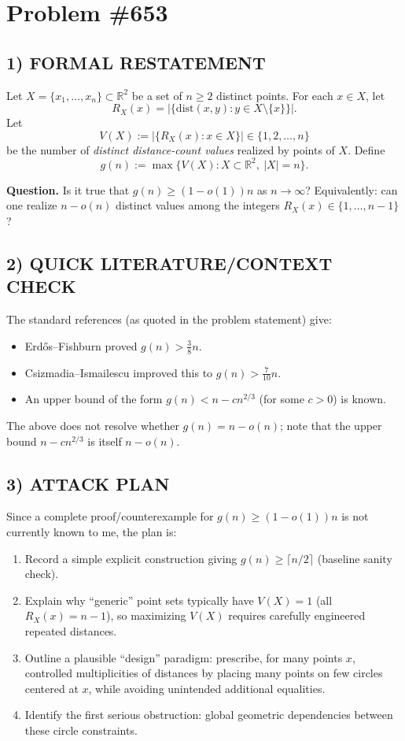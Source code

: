 \section*{Problem \#653}

\subsection*{1) FORMAL RESTATEMENT}

Let $X=\{x_1,\dots,x_n\}\subset\mathbb{R}^2$ be a set of $n\ge 2$ distinct points.
For each $x\in X$, let
\[
R_X(x)=\left\lvert \{\mathrm{dist}(x,y):y\in X\setminus\{x\}\} \right\rvert.
\]
Let
\[
V(X):=\left\lvert \{R_X(x):x\in X\} \right\rvert\in\{1,2,\dots,n\}
\]
be the number of \emph{distinct distance-count values} realized by points of $X$.
Define
\[
 g(n):=\max\{V(X):X\subset\mathbb{R}^2,\ \left\lvert X \right\rvert=n\}.
\]

\medskip
\noindent
\textbf{Question.} Is it true that $g(n)\ge (1-o(1))n$ as $n\to\infty$?
Equivalently: can one realize $n-o(n)$ distinct values among the integers $R_X(x)\in\{1,\dots,n-1\}$?

\subsection*{2) QUICK LITERATURE/CONTEXT CHECK}

The standard references (as quoted in the problem statement) give:
\begin{itemize}[leftmargin=2.2em]
\item Erd\H{o}s--Fishburn proved $g(n)>\tfrac{3}{8}n$.
\item Csizmadia--Ismailescu improved this to $g(n)>\tfrac{7}{10}n$.
\item An upper bound of the form $g(n)<n-cn^{2/3}$ (for some $c>0$) is known.
\end{itemize}
The above does not resolve whether $g(n)=n-o(n)$; note that the upper bound $n-cn^{2/3}$ is itself $n-o(n)$.

\subsection*{3) ATTACK PLAN}

Since a complete proof/counterexample for $g(n)\ge (1-o(1))n$ is not currently known to me, the plan is:
\begin{enumerate}[leftmargin=2.2em]
\item Record a simple explicit construction giving $g(n)\ge \lceil n/2\rceil$ (baseline sanity check).
\item Explain why ``generic'' point sets typically have $V(X)=1$ (all $R_X(x)=n-1$), so maximizing $V(X)$ requires carefully engineered repeated distances.
\item Outline a plausible ``design'' paradigm: prescribe, for many points $x$, controlled multiplicities of distances by placing many points on few circles centered at $x$, while avoiding unintended additional equalities.
\item Identify the first serious obstruction: global geometric dependencies between these circle constraints.
\end{enumerate}

